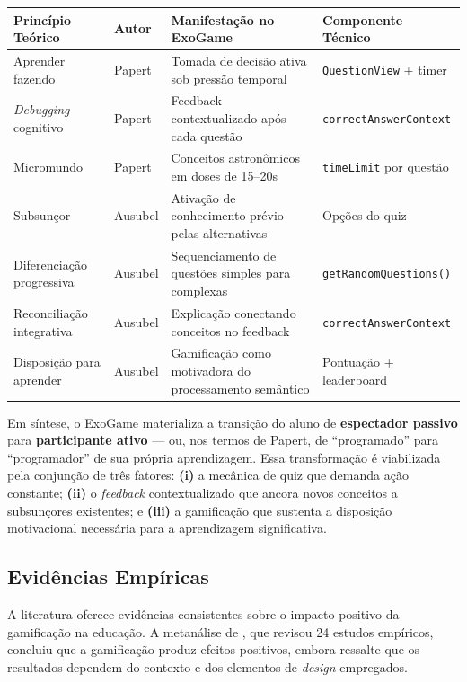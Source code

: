 \documentclass[
	12pt,
	openany,
	oneside,
	a4paper,
	english,
	brazil
]{abntex2}
\begin{document}
\begin{quadro}[htb]
\caption{\label{quad:teorias_aprendizagem}Mapeamento das teorias de aprendizagem no ExoGame}
\begin{tabular}{|p{3cm}|p{3.5cm}|p{3.5cm}|p{3cm}|}
	\hline
	\textbf{Princípio Teórico} & \textbf{Autor} & \textbf{Manifestação no ExoGame} & \textbf{Componente Técnico} \\ \hline
	Aprender fazendo & Papert & Tomada de decisão ativa sob pressão temporal & \texttt{QuestionView} + timer \\ \hline
	\textit{Debugging} cognitivo & Papert & Feedback contextualizado após cada questão & \texttt{correctAnswerContext} \\ \hline
	Micromundo & Papert & Conceitos astronômicos em doses de 15--20s & \texttt{timeLimit} por questão \\ \hline
	Subsunçor & Ausubel & Ativação de conhecimento prévio pelas alternativas & Opções do quiz \\ \hline
	Diferenciação progressiva & Ausubel & Sequenciamento de questões simples para complexas & \texttt{getRandomQuestions()} \\ \hline
	Reconciliação integrativa & Ausubel & Explicação conectando conceitos no feedback & \texttt{correctAnswerContext} \\ \hline
	Disposição para aprender & Ausubel & Gamificação como motivadora do processamento semântico & Pontuação + leaderboard \\ \hline
\end{tabular}
\end{quadro}

Em síntese, o ExoGame materializa a transição do aluno de \textbf{espectador passivo} para \textbf{participante ativo} --- ou, nos termos de Papert, de ``programado'' para ``programador'' de sua própria aprendizagem. Essa transformação é viabilizada pela conjunção de três fatores: \textbf{(i)} a mecânica de quiz que demanda ação constante; \textbf{(ii)} o \textit{feedback} contextualizado que ancora novos conceitos a subsunçores existentes; e \textbf{(iii)} a gamificação que sustenta a disposição motivacional necessária para a aprendizagem significativa.

\subsection{Evidências Empíricas}

A literatura oferece evidências consistentes sobre o impacto positivo da gamificação na educação. A metanálise de , que revisou 24 estudos empíricos, concluiu que a gamificação produz efeitos positivos, embora ressalte que os resultados dependem do contexto e dos elementos de \textit{design} empregados.
\end{document}
